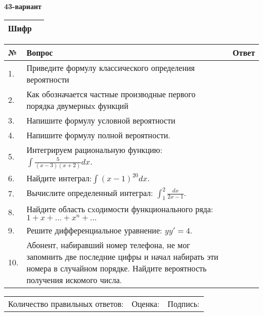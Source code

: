 \documentclass{article}
\begin{document}
  \egroup
  
  \newpage
  
  
  \textbf{43-вариант}\\
  
  \bgroup
  \def\arraystretch{1.6} %
  
  \begin{tabular}{|m{5.7cm}|m{9.5cm}|}
  \hline
  Шифр & \\
  \hline
  \end{tabular}
  
  \vspace{1cm}
  
  \begin{tabular}{|m{0.7cm}|m{10cm}|m{4cm}|}
  \hline
  № & Вопрос & Ответ \\
  \hline
  1. & Приведите формулу классического определения вероятности &  \\
  \hline
  2. & Как обозначается частные производные первого порядка двумерныx функций &  \\
  \hline
  3. & Напишите формулу условной вероятности &  \\
  \hline
  4. & Напишите формулу полной вероятности. &  \\
  \hline
  5. & Интегрируем рациональную функцию: \(\int{\frac{5}{(x - 3)(x + 2)}dx}\). &  \\
  \hline
  6. & Найдите интеграл:\(\int{(x - 1)^{20}}dx\). &  \\
  \hline
  7. & Вычислите определенный интеграл: \(\int_{1}^{2}\frac{dx}{2x -1}\). &  \\
  \hline
  8. & Найдите область сxодимости функционального ряда:\(1 + x + ... + x^{n} + ...\) &  \\
  \hline
  9. & Решите дифференциальное уравнение: \(yy' = 4\). &  \\
  \hline
  10. & Абонент, набиравший номер телефона, не мог запомнить две последние цифры и начал набирать эти номера в случайном порядке. Найдите вероятность получения искомого числа. &  \\
  \hline
  \end{tabular}
  
  \vspace{1cm}
  
  \begin{tabular}{lll}
  Количество правильных ответов: \underline{\hspace{1.5cm}} & 
  Оценка: \underline{\hspace{1.5cm}} & 
  Подпись: \underline{\hspace{2cm}} \\
  \end{tabular}
  
\end{document}
